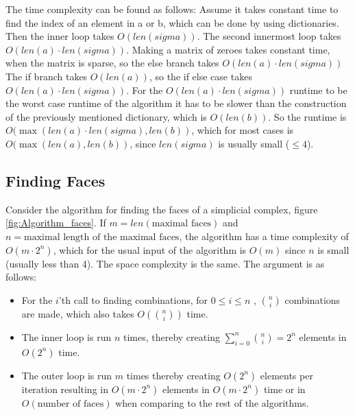 \documentclass[11pt,a4paper,twoside]{report}
\begin{document}
The time complexity can be found as follows:
Assume it takes constant time to find the index of an element in a or b, which can be done by using dictionaries. Then the inner loop takes $O(len(sigma))$.
The second innermost loop takes $O(len(a)\cdot len(sigma))$.
Making a matrix of zeroes takes constant time, when the matrix is sparse, so the else branch takes $O(len(a)\cdot len(sigma))$
The if branch takes $O(len(a))$, so the if else case takes $O(len(a)\cdot len(sigma))$. 
For the $O(len(a)\cdot len(sigma))$ runtime to be the worst case runtime of the algorithm it has to be slower than the construction of the previously mentioned dictionary, which is $O(len(b))$.
So the runtime is $O(\max(len(a)\cdot len(sigma),len(b))$, which for most cases is $O(\max(len(a),len(b))$, since $len(sigma)$ is usually small ($\leq 4$).
 

\subsection{Finding Faces}
Consider the algorithm for finding the faces of a simplicial complex, figure \ref{fig:Algorithm_faces}. If $m = len(\text{maximal faces})$ and $n = \text{maximal length of the maximal faces}$, the algorithm has a time complexity of $O(m\cdot 2^n)$, which for the usual input of the algorithm is $O(m)$ since $n$ is small (usually less than 4). The space complexity is the same. The argument is as follows:
\begin{itemize}
\item For the $i$'th call to finding combinations, for $0\leq i\leq n$ , $\binom{n}{i}$ combinations are made, which also takes $O(\binom{n}{i})$ time.
\item The inner loop is run $n$ times, thereby creating $\sum_{i=0}^n\binom{n}{i}=2^n$  elements in $O(2^n)$ time.
\item The outer loop is run $m$ times thereby creating $O(2^n)$ elements per iteration resulting in $O(m\cdot 2^n)$ elements in $O(m\cdot 2^n)$ time or in $O(\text{number of faces})$ when comparing to the rest of the algorithms.
\end{itemize}
\end{document}
